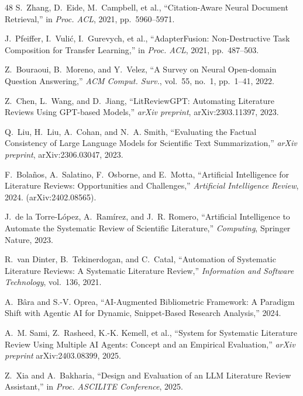 \documentclass[conference,10pt,twocolumn]{IEEEtran}
\begin{document}
\begin{thebibliography}{48}
S.~Zhang, D.~Eide, M.~Campbell, et al., ``Citation-Aware Neural Document Retrieval,'' in \textit{Proc. ACL}, 2021, pp.~5960--5971.

J.~Pfeiffer, I.~Vuli\'{c}, I.~Gurevych, et al., ``AdapterFusion: Non-Destructive Task Composition for Transfer Learning,'' in \textit{Proc. ACL}, 2021, pp.~487--503.

Z.~Bouraoui, B.~Moreno, and Y.~Velez, ``A Survey on Neural Open-domain Question Answering,'' \textit{ACM Comput. Surv.}, vol.~55, no.~1, pp.~1--41, 2022.

Z.~Chen, L.~Wang, and D.~Jiang, ``LitReviewGPT: Automating Literature Reviews Using GPT-based Models,'' \textit{arXiv preprint}, arXiv:2303.11397, 2023.

Q.~Liu, H.~Liu, A.~Cohan, and N.~A. Smith, ``Evaluating the Factual Consistency of Large Language Models for Scientific Text Summarization,'' \textit{arXiv preprint}, arXiv:2306.03047, 2023.

F.~Bola\~{n}os, A.~Salatino, F.~Osborne, and E.~Motta, ``Artificial Intelligence for Literature Reviews: Opportunities and Challenges,'' \textit{Artificial Intelligence Review}, 2024. (arXiv:2402.08565).

J.~de la Torre-L\'{o}pez, A.~Ram\'{i}rez, and J.~R. Romero, ``Artificial Intelligence to Automate the Systematic Review of Scientific Literature,'' \textit{Computing}, Springer Nature, 2023.

R.~van Dinter, B.~Tekinerdogan, and C.~Catal, ``Automation of Systematic Literature Reviews: A Systematic Literature Review,'' \textit{Information and Software Technology}, vol.~136, 2021.

A.~B\^{a}ra and S.-V. Oprea, ``AI-Augmented Bibliometric Framework: A Paradigm Shift with Agentic AI for Dynamic, Snippet-Based Research Analysis,'' 2024.

A.~M. Sami, Z.~Rasheed, K.-K. Kemell, et al., ``System for Systematic Literature Review Using Multiple AI Agents: Concept and an Empirical Evaluation,'' \textit{arXiv preprint} arXiv:2403.08399, 2025.

Z.~Xia and A.~Bakharia, ``Design and Evaluation of an LLM Literature Review Assistant,'' in \textit{Proc. ASCILITE Conference}, 2025.


\end{thebibliography}
\end{document}
